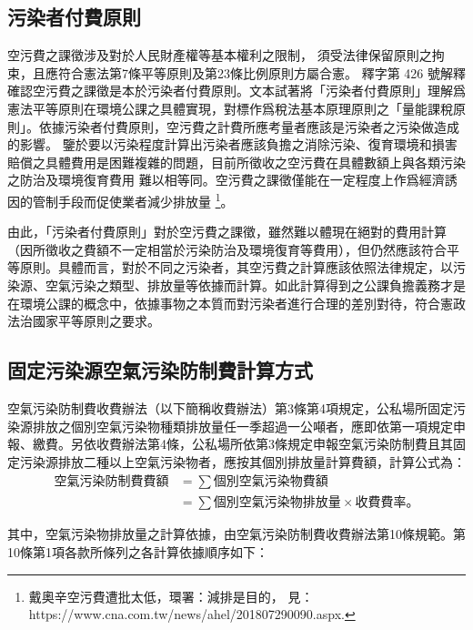 \subsection{污染者付費原則}
空污費之課徵涉及對於人民財產權等基本權利之限制，
須受法律保留原則之拘束，且應符合憲法第7條平等原則及第23條比例原則方屬合憲。
釋字第 426 號解釋確認空污費之課徵是本於污染者付費原則。文本試著將「污染者付費原則」理解爲憲法平等原則在環境公課之具體實現，對標作爲稅法基本原理原則之「量能課稅原則」。依據污染者付費原則，空污費之計費所應考量者應該是污染者之污染做造成的影響。
鑒於要以污染程度計算出污染者應該負擔之消除污染、復育環境和損害賠償之具體費用是困難複雜的問題，目前所徵收之空污費在具體數額上與各類污染之防治及環境復育費用
難以相等同。空污費之課徵僅能在一定程度上作爲經濟誘因的管制手段而促使業者減少排放量
\footnote{戴奧辛空污費遭批太低，環署：減排是目的，
見：https://www.cna.com.tw/news/ahel/201807290090.aspx.}。

由此，「污染者付費原則」對於空污費之課徵，雖然難以體現在絕對的費用計算（因所徵收之費額不一定相當於污染防治及環境復育等費用），但仍然應該符合平等原則。具體而言，對於不同之污染者，其空污費之計算應該依照法律規定，以污染源、空氣污染之類型、排放量等依據而計算。如此計算得到之公課負擔義務才是在環境公課的概念中，依據事物之本質而對污染者進行合理的差別對待，符合憲政法治國家平等原則之要求。



\subsection{固定污染源空氣污染防制費計算方式}
空氣污染防制費收費辦法（以下簡稱收費辦法）第3條第4項規定，公私場所固定污染源排放之個別空氣污染物種類排放量任一季超過一公噸者，應即依第一項規定申報、繳費。另依收費辦法第4條，公私場所依第3條規定申報空氣污染防制費且其固定污染源排放二種以上空氣污染物者，應按其個別排放量計算費額，計算公式為：
\begin{equation*}
   \begin{aligned}
     \text{空氣污染防制費費額}&=\sum \text{個別空氣污染物費額}\\
     &=\sum\text{個別空氣污染物排放量}\times \text{收費費率。}
   \end{aligned}
 \end{equation*}


其中，空氣污染物排放量之計算依據，由空氣污染防制費收費辦法第10條規範。第10條第1項各款所條列之各計算依據順序如下：

